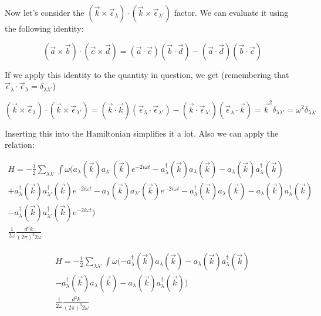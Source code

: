 \documentclass[a4]{article}
\begin{document}
    Now let's consider the $(\vec{k} \times \vec{\epsilon}_{\lambda}) \cdot (\vec{k} \times \vec{\epsilon}_{\lambda'})$ factor. We can evaluate it using the following identity:

    \begin{equation}
        (\vec{a} \times \vec{b}) \cdot (\vec{c} \times \vec{d}) = (\vec{a} \cdot \vec{c}) (\vec{b} \cdot \vec{d}) - (\vec{a} \cdot \vec{d}) (\vec{b} \cdot \vec{c})
    \end{equation}

    If we apply this identity to the quantity in question, we get (remembering that $\vec{\epsilon}_{\lambda} \cdot \vec{\epsilon}_{\lambda} = \delta_{\lambda \lambda'}$)

    \begin{equation}
        (\vec{k} \times \vec{\epsilon}_{\lambda}) \cdot (\vec{k} \times \vec{\epsilon}_{\lambda'}) = (\vec{k} \cdot \vec{k}) (\vec{\epsilon}_{\lambda} \cdot \vec{\epsilon}_{\lambda'}) - (\vec{k} \cdot \vec{\epsilon}_{\lambda'}) (\vec{\epsilon}_{\lambda} \cdot \vec{k}) = \vec{k}^{2} \delta_{\lambda \lambda'} = \omega^{2} \delta_{\lambda \lambda'}
    \end{equation}

    Inserting this into the Hamiltonian simplifies it a lot. Also we can apply the relation:

    \begin{equation}
        \begin{aligned}
            H = -\frac{1}{2} \sum_{\lambda \lambda'} \int \omega (a_{\lambda} (\vec{k}) a_{\lambda'} (\vec{k}) e^{-2 i \omega t} - a_{\lambda}^{\dagger} (\vec{k}) a_{\lambda} (\vec{k}) - a_{\lambda} (\vec{k}) a_{\lambda}^{\dagger}  (\vec{k})  \\
            + a_{\lambda}^{\dagger} (\vec{k}) a_{\lambda'}^{\dagger} (\vec{k}) e^{-2 i \omega t} - a_{\lambda} (\vec{k}) a_{\lambda'} (\vec{k}) e^{-2 i \omega t} - a_{\lambda}^{\dagger} (\vec{k}) a_{\lambda} (\vec{k}) - a_{\lambda} (\vec{k}) a_{\lambda}^{\dagger}  (\vec{k}) \\
            - a_{\lambda}^{\dagger} (\vec{k}) a_{\lambda'}^{\dagger} (\vec{k}) e^{-2 i \omega t}) \\
            \frac{1}{2 \omega} \frac{d^{3} k}{(2 \pi)^{3} 2 \omega}
        \end{aligned}
    \end{equation}

    \begin{equation}
        \begin{aligned}
            H = -\frac{1}{2} \sum_{\lambda \lambda'} \int \omega (- a_{\lambda}^{\dagger} (\vec{k}) a_{\lambda} (\vec{k}) - a_{\lambda} (\vec{k}) a_{\lambda}^{\dagger}  (\vec{k})  \\
            - a_{\lambda}^{\dagger} (\vec{k}) a_{\lambda} (\vec{k}) - a_{\lambda} (\vec{k}) a_{\lambda}^{\dagger}  (\vec{k}) ) \\
            \frac{1}{2 \omega} \frac{d^{3} k}{(2 \pi)^{3} 2 \omega}
        \end{aligned}
    \end{equation}
\end{document}
